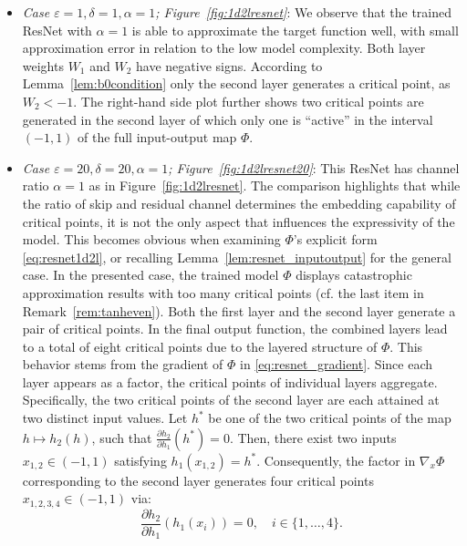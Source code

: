 \documentclass[10pt]{article}
\theoremstyle{definition}
\numberwithin{equation}{section}
\newcommand{\eps}{\varepsilon}
\begin{document}
\begin{itemize}
   \item   \emph{Case $\eps = 1, \delta = 1, \alpha = 1$; Figure~\ref{fig:1d2lresnet}}: We observe that the trained ResNet with $\alpha = 1$ is able to approximate the target function well, with small approximation error in relation to the low model complexity. Both layer weights $W_1$ and $W_2$ have negative signs. According to Lemma~\ref{lem:b0condition} only the second layer generates a critical point, as $W_2 < -1$. The right-hand side plot further shows two critical points are generated in the second layer of which only one is ``active'' in the interval $(-1,1)$ of the full input-output map $\Phi$.





 \item \emph{Case $\eps = 20, \delta = 20, \alpha = 1$; Figure~\ref{fig:1d2lresnet20}}: This ResNet has channel ratio $\alpha = 1$ as in Figure~\ref{fig:1d2lresnet}. The comparison highlights that while the ratio of skip and residual channel determines the embedding capability of critical points, it is not the only aspect that influences the expressivity of the model. This becomes obvious when examining $\Phi$'s explicit form \eqref{eq:resnet1d2l}, or recalling Lemma~\ref{lem:resnet_inputoutput} for the general case. In the presented case, the trained model $\Phi$ displays catastrophic approximation results with too many critical points (cf. the last item in Remark~\ref{rem:tanheven}). Both the first layer and the second layer generate a pair of critical points. In the final output function, the combined layers lead to a total of eight critical points due to the layered structure of $\Phi$. This behavior stems from the gradient of $\Phi$ in \eqref{eq:resnet_gradient}. Since each layer appears as a factor, the critical points of individual layers aggregate. Specifically, the two critical points of the second layer are each attained at two distinct input values. Let $h^*$ be one of the two critical points of the map $h \mapsto h_2(h)$, such that $\frac{\partial h_2}{\partial h_1}(h^*) = 0$. Then, there exist two inputs $x_{1,2} \in (-1,1)$ satisfying $h_1(x_{1,2}) = h^*$. Consequently, the factor in $\nabla_x \Phi$ corresponding to the second layer generates four critical points $x_{1,2,3,4} \in (-1,1)$ via:
\begin{equation}
\frac{\partial h_2}{\partial h_1}(h_1(x_{i})) = 0, \quad i \in \{1, \dots, 4\}.
 \end{equation}



\end{itemize}
\end{document}
